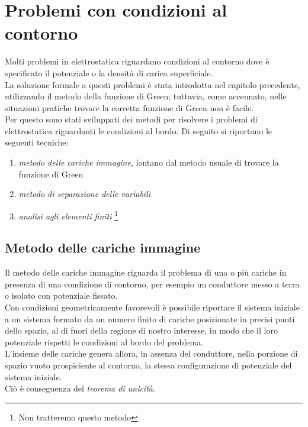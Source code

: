 \chapter{Problemi con condizioni al contorno}

Molti problemi in elettrostatica riguardano condizioni al contorno dove è specificato il potenziale o la densità di carica superficiale. \\ La soluzione formale a questi problemi è stata introdotta nel capitolo precedente, utilizzando il metodo della funzione di Green; tuttavia, come accennato, nelle situazioni pratiche trovare la corretta funzione di Green non è facile. \\

Per questo sono stati sviluppati dei metodi per risolvere i problemi di elettrostatica riguardanti le condizioni al bordo. Di seguito si riportano le seguenti tecniche:

\begin{enumerate}
    \item \emph{metodo delle cariche immagine}, lontano dal metodo usuale di trovare la funzione di Green
    \item \emph{metodo di separazione delle variabili}
    \item \emph{analisi agli elementi finiti} \footnote{Non tratteremo questo metodo}
\end{enumerate}

\section{Metodo delle cariche immagine}

Il metodo delle cariche immagine riguarda il problema di una o più cariche in presenza di una condizione di contorno, per esempio un conduttore messo a terra o isolato con potenziale fissato. \\

Con condizioni geometricamente favorevoli è possibile riportare il sistema iniziale a un sistema formato da un numero finito di cariche posizionate in precisi punti dello spazio, al di fuori della regione di nostro interesse, in modo che il loro potenziale rispetti le condizioni al bordo del problema. \\

L'insieme delle cariche genera allora, in assenza del conduttore, nella porzione di spazio vuoto prospiciente al contorno, la stessa configurazione di potenziale del sistema iniziale. \\ 
Ciò è conseguenza del \textit{teorema di unicità}.\\

